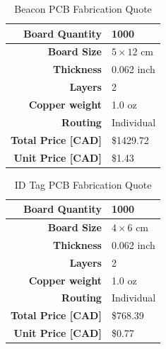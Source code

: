 \medskip
\bgroup
\def\arraystretch{1.5}
\begin{table}[H]
\centering
\begin{tabular}{ | m{6cm} | m{12cm} |}
\hline
\multicolumn{1}{|r|}{\textbf{Board Quantity}} & 1000 \\
\hline
\multicolumn{1}{|r|}{\textbf{Board Size}} & $5\times12$ cm \\
\hline
\multicolumn{1}{|r|}{\textbf{Thickness}} & 0.062 inch \\
\hline
\multicolumn{1}{|r|}{\textbf{Layers}} & 2 \\
\hline
\multicolumn{1}{|r|}{\textbf{Copper weight}} & 1.0 oz \\
\hline
\multicolumn{1}{|r|}{\textbf{Routing}} & Individual \\
\hline
\multicolumn{1}{|r|}{\textbf{Total Price [CAD]}} & \$1429.72 \\
\hline
\multicolumn{1}{|r|}{\textbf{Unit Price [CAD]}} & \$1.43 \\
\hline
\end{tabular}
\caption{Beacon PCB Fabrication Quote}
\end{table}

\bgroup
\def\arraystretch{1.5}
\begin{table}[H]
\centering
\begin{tabular}{ | m{6cm} | m{12cm} |}
\hline
\multicolumn{1}{|r|}{\textbf{Board Quantity}} & 1000 \\
\hline
\multicolumn{1}{|r|}{\textbf{Board Size}} & $4\times6$ cm \\
\hline
\multicolumn{1}{|r|}{\textbf{Thickness}} & 0.062 inch \\
\hline
\multicolumn{1}{|r|}{\textbf{Layers}} & 2 \\
\hline
\multicolumn{1}{|r|}{\textbf{Copper weight}} & 1.0 oz \\
\hline
\multicolumn{1}{|r|}{\textbf{Routing}} & Individual \\
\hline
\multicolumn{1}{|r|}{\textbf{Total Price [CAD]}} & \$768.39 \\
\hline
\multicolumn{1}{|r|}{\textbf{Unit Price [CAD]}} & \$0.77 \\
\hline
\end{tabular}
\caption{ID Tag PCB Fabrication Quote}
\end{table}

